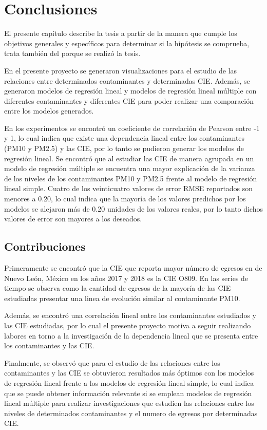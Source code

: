 \chapter{Conclusiones}
El presente capítulo describe la tesis a partir de la manera que cumple los objetivos generales y específicos para determinar si la hipótesis se comprueba, trata también del porque se realizó la tesis.

En el presente proyecto se generaron visualizaciones para el estudio de las relaciones entre determinados contaminantes y determinadas CIE. Además, se generaron modelos de regresión lineal y modelos de regresión lineal múltiple con diferentes contaminantes y diferentes CIE para poder realizar una comparación entre los modelos generados.

En los experimentos se encontró un coeficiente de correlación de Pearson entre -1 y 1, lo cual indica que existe una dependencia lineal entre los contaminantes (PM10 y PM2.5) y las CIE, por lo tanto se pudieron generar los modelos de regresión lineal. Se encontró que al estudiar las CIE de manera agrupada en un modelo de regresión múltiple se encuentra una mayor explicación de la varianza de los niveles de los contaminantes PM10 y PM2.5 frente al modelo de regresión lineal simple. Cuatro de los veinticuatro valores de error RMSE reportados son menores a 0.20, lo cual indica que la mayoría de los valores predichos por los modelos se alejaron más de 0.20 unidades de los valores reales, por lo tanto dichos valores de error son mayores a los deseados.

\clearpage

\section{Contribuciones}
Primeramente se encontró que la CIE que reporta mayor número de egresos en de Nuevo León, México en los años 2017 y 2018 es la CIE O809. En las series de tiempo se observa como la cantidad de egresos de la mayoría de las CIE estudiadas presentar una linea de evolución similar al contaminante PM10.

Además, se encontró una correlación lineal entre los contaminantes estudiados y las CIE estudiadas, por lo cual el presente proyecto motiva a seguir realizando labores en torno a la investigación de la dependencia lineal que se presenta entre los contaminantes y las CIE.

Finalmente, se observó que para el estudio de las relaciones entre los contaminantes y las CIE se obtuvieron resultados más óptimos con los modelos de regresión lineal frente a los modelos de regresión lineal simple, lo cual indica que se puede obtener información relevante si se emplean modelos de regresión lineal múltiple para realizar investigaciones que estudien las relaciones entre los niveles de determinados contaminantes y el numero de egresos por determinadas CIE.

